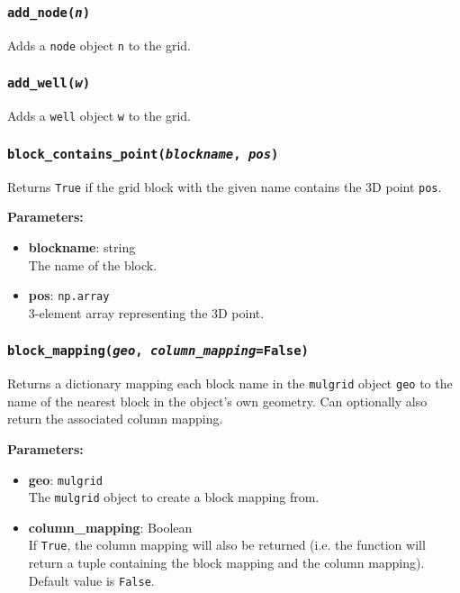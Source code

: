 \subsubsection{\texttt{add\_node(\emph{n})}}
\label{sec:add_node}

Adds a \texttt{node} object \texttt{n} to the grid.

\subsubsection{\texttt{add\_well(\emph{w})}}
\label{sec:add_well}

Adds a \texttt{well} object \texttt{w} to the grid.

\subsubsection{\texttt{block\_contains\_point(\emph{blockname}, \emph{pos})}}
\label{sec:block_contains_point}

Returns \texttt{True} if the grid block with the given name contains the 3D point \texttt{pos}.

\textbf{Parameters:}
\begin{itemize}
\item \textbf{blockname}: string\\
  The name of the block.
\item \textbf{pos}: \texttt{np.array}\\
  3-element array representing the 3D point.
\end{itemize}

\subsubsection{\texttt{block\_mapping(\emph{geo}, \emph{column\_mapping}=\texttt{False})}}
\label{sec:block_mapping}

Returns a dictionary mapping each block name in the \texttt{mulgrid} object \texttt{geo} to the name of the nearest block in the object's own geometry.  Can optionally also return the associated column mapping.

\textbf{Parameters:}
\begin{itemize}
\item \textbf{geo}: \texttt{mulgrid}\\
  The \texttt{mulgrid} object to create a block mapping from.
\item \textbf{column\_mapping}: Boolean\\
  If \texttt{True}, the column mapping will also be returned (i.e. the function will return a tuple containing the block mapping and the column mapping).  Default value is \texttt{False}.
\end{itemize}

